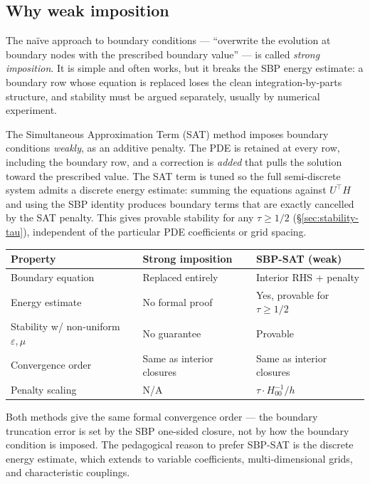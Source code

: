 \documentclass[11pt]{article}
\newcommand{\eps}{\varepsilon}
\begin{document}
\subsection{Why weak imposition}

The naïve approach to boundary conditions --- ``overwrite the
evolution at boundary nodes with the prescribed boundary value''
--- is called \emph{strong imposition}.  It is simple and often
works, but it breaks the SBP energy estimate: a boundary row whose
equation is replaced loses the clean integration-by-parts
structure, and stability must be argued separately, usually by
numerical experiment.

The Simultaneous Approximation Term (SAT) method imposes boundary
conditions \emph{weakly}, as an additive penalty.  The PDE is
retained at every row, including the boundary row, and a correction
is \emph{added} that pulls the solution toward the prescribed
value.  The SAT term is tuned so the full semi-discrete system
admits a discrete energy estimate: summing the equations against
$U^\top H$ and using the SBP identity produces boundary terms that
are exactly cancelled by the SAT penalty.  This gives provable
stability for any $\tau \geq 1/2$
(\S\ref{sec:stability-tau}), independent of the particular PDE
coefficients or grid spacing.

\begin{center}
\small
\begin{tabular}{lll}
\toprule
Property                       & Strong imposition            & SBP-SAT (weak)      \\
\midrule
Boundary equation              & Replaced entirely            & Interior RHS + penalty \\
Energy estimate                & No formal proof              & Yes, provable for $\tau \geq 1/2$ \\
Stability w/ non-uniform $\eps, \mu$ & No guarantee           & Provable \\
Convergence order              & Same as interior closures    & Same as interior closures \\
Penalty scaling                & N/A                          & $\tau \cdot H^{-1}_{00}/h$ \\
\bottomrule
\end{tabular}
\end{center}

Both methods give the same formal convergence order --- the
boundary truncation error is set by the SBP one-sided closure, not
by how the boundary condition is imposed.  The pedagogical reason
to prefer SBP-SAT is the discrete energy estimate, which extends
to variable coefficients, multi-dimensional grids, and
characteristic couplings.
\end{document}
